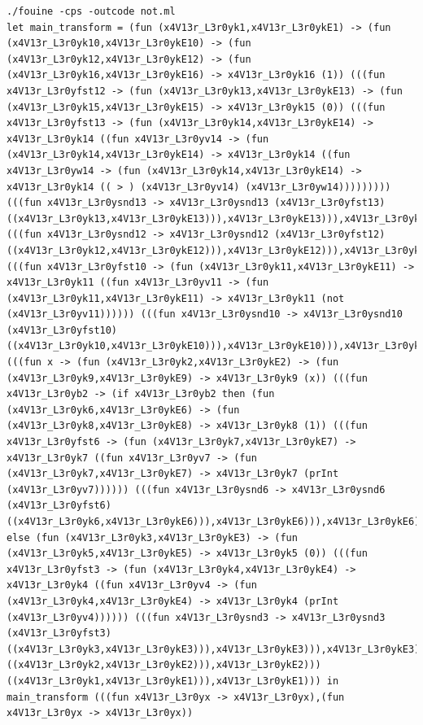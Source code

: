 \documentclass{beamer}
\begin{document}
\begin{frame}[fragile]
  \fontsize{7}{7} \selectfont
  \begin{verbatim}
./fouine -cps -outcode not.ml
let main_transform = (fun (x4V13r_L3r0yk1,x4V13r_L3r0ykE1) -> (fun (x4V13r_L3r0yk10,x4V13r_L3r0ykE10) -> (fun (x4V13r_L3r0yk12,x4V13r_L3r0ykE12) -> (fun (x4V13r_L3r0yk16,x4V13r_L3r0ykE16) -> x4V13r_L3r0yk16 (1)) (((fun x4V13r_L3r0yfst12 -> (fun (x4V13r_L3r0yk13,x4V13r_L3r0ykE13) -> (fun (x4V13r_L3r0yk15,x4V13r_L3r0ykE15) -> x4V13r_L3r0yk15 (0)) (((fun x4V13r_L3r0yfst13 -> (fun (x4V13r_L3r0yk14,x4V13r_L3r0ykE14) -> x4V13r_L3r0yk14 ((fun x4V13r_L3r0yv14 -> (fun (x4V13r_L3r0yk14,x4V13r_L3r0ykE14) -> x4V13r_L3r0yk14 ((fun x4V13r_L3r0yw14 -> (fun (x4V13r_L3r0yk14,x4V13r_L3r0ykE14) -> x4V13r_L3r0yk14 (( > ) (x4V13r_L3r0yv14) (x4V13r_L3r0yw14))))))))) (((fun x4V13r_L3r0ysnd13 -> x4V13r_L3r0ysnd13 (x4V13r_L3r0yfst13) ((x4V13r_L3r0yk13,x4V13r_L3r0ykE13))),x4V13r_L3r0ykE13))),x4V13r_L3r0ykE13))) (((fun x4V13r_L3r0ysnd12 -> x4V13r_L3r0ysnd12 (x4V13r_L3r0yfst12) ((x4V13r_L3r0yk12,x4V13r_L3r0ykE12))),x4V13r_L3r0ykE12))),x4V13r_L3r0ykE12))) (((fun x4V13r_L3r0yfst10 -> (fun (x4V13r_L3r0yk11,x4V13r_L3r0ykE11) -> x4V13r_L3r0yk11 ((fun x4V13r_L3r0yv11 -> (fun (x4V13r_L3r0yk11,x4V13r_L3r0ykE11) -> x4V13r_L3r0yk11 (not (x4V13r_L3r0yv11)))))) (((fun x4V13r_L3r0ysnd10 -> x4V13r_L3r0ysnd10 (x4V13r_L3r0yfst10) ((x4V13r_L3r0yk10,x4V13r_L3r0ykE10))),x4V13r_L3r0ykE10))),x4V13r_L3r0ykE10))) (((fun x -> (fun (x4V13r_L3r0yk2,x4V13r_L3r0ykE2) -> (fun (x4V13r_L3r0yk9,x4V13r_L3r0ykE9) -> x4V13r_L3r0yk9 (x)) (((fun x4V13r_L3r0yb2 -> (if x4V13r_L3r0yb2 then (fun (x4V13r_L3r0yk6,x4V13r_L3r0ykE6) -> (fun (x4V13r_L3r0yk8,x4V13r_L3r0ykE8) -> x4V13r_L3r0yk8 (1)) (((fun x4V13r_L3r0yfst6 -> (fun (x4V13r_L3r0yk7,x4V13r_L3r0ykE7) -> x4V13r_L3r0yk7 ((fun x4V13r_L3r0yv7 -> (fun (x4V13r_L3r0yk7,x4V13r_L3r0ykE7) -> x4V13r_L3r0yk7 (prInt (x4V13r_L3r0yv7)))))) (((fun x4V13r_L3r0ysnd6 -> x4V13r_L3r0ysnd6 (x4V13r_L3r0yfst6) ((x4V13r_L3r0yk6,x4V13r_L3r0ykE6))),x4V13r_L3r0ykE6))),x4V13r_L3r0ykE6))) else (fun (x4V13r_L3r0yk3,x4V13r_L3r0ykE3) -> (fun (x4V13r_L3r0yk5,x4V13r_L3r0ykE5) -> x4V13r_L3r0yk5 (0)) (((fun x4V13r_L3r0yfst3 -> (fun (x4V13r_L3r0yk4,x4V13r_L3r0ykE4) -> x4V13r_L3r0yk4 ((fun x4V13r_L3r0yv4 -> (fun (x4V13r_L3r0yk4,x4V13r_L3r0ykE4) -> x4V13r_L3r0yk4 (prInt (x4V13r_L3r0yv4)))))) (((fun x4V13r_L3r0ysnd3 -> x4V13r_L3r0ysnd3 (x4V13r_L3r0yfst3) ((x4V13r_L3r0yk3,x4V13r_L3r0ykE3))),x4V13r_L3r0ykE3))),x4V13r_L3r0ykE3)))) ((x4V13r_L3r0yk2,x4V13r_L3r0ykE2))),x4V13r_L3r0ykE2))) ((x4V13r_L3r0yk1,x4V13r_L3r0ykE1))),x4V13r_L3r0ykE1))) in main_transform (((fun x4V13r_L3r0yx -> x4V13r_L3r0yx),(fun x4V13r_L3r0yx -> x4V13r_L3r0yx))
  \end{verbatim}
\end{frame}
\end{document}

